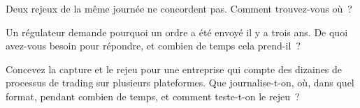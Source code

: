 \begin{interviewq}\label{iq:ll:logging-capture-and-replay:4}
Deux rejeux de la même journée ne concordent pas. Comment trouvez-vous où~?
\end{interviewq}

\begin{interviewq}\label{iq:ll:logging-capture-and-replay:5}
Un régulateur demande pourquoi un ordre a été envoyé il y a trois ans. De quoi avez-vous besoin pour répondre, et combien de temps cela prend-il~?
\end{interviewq}

\begin{interviewq}\label{iq:ll:logging-capture-and-replay:6}
Concevez la capture et le rejeu pour une entreprise qui compte des dizaines de processus de trading sur plusieurs plateformes. Que journalise-t-on, où, dans quel
format, pendant combien de temps, et comment teste-t-on le rejeu~?
\end{interviewq}
